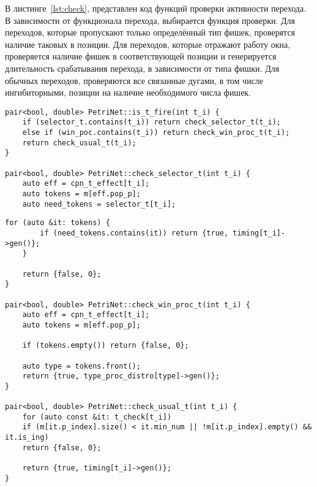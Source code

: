 В листинге~\ref{lst:check}, представлен код функций проверки активности перехода. В зависимости от функционала перехода, выбирается функция проверки. Для переходов, которые пропускают только определённый тип фишек, проверятся наличие таковых в позиции. Для переходов, которые отражают работу окна, проверяется наличие фишек в соответствующей позиции и генерируется длительность срабатывания перехода, в зависимости от типа фишки. Для обычных переходов, проверяются все связанные дугами, в том числе ингибиторными, позиции на наличие необходимого числа фишек.

\begin{center}
	\captionsetup{justification=raggedright,singlelinecheck=off}
	\begin{lstlisting}[label=lst:check,caption=Функции проверки автивности перехода ,showstringspaces=false]
pair<bool, double> PetriNet::is_t_fire(int t_i) {
	if (selector_t.contains(t_i)) return check_selector_t(t_i);
	else if (win_poc.contains(t_i)) return check_win_proc_t(t_i);
	return check_usual_t(t_i);
}

pair<bool, double> PetriNet::check_selector_t(int t_i) {
	auto eff = cpn_t_effect[t_i];
	auto tokens = m[eff.pop_p];
	auto need_tokens = selector_t[t_i];
	\end{lstlisting}
\end{center}
\FloatBarrier

\begin{center}
	\captionsetup{justification=raggedright,singlelinecheck=off}
	\begin{lstlisting}[label=lst:check2,title=Продолжение листинга \ref{lst:check},showstringspaces=false,firstnumber=11]
	for (auto &it: tokens) {
		if (need_tokens.contains(it)) return {true, timing[t_i]->gen()};
	}
	
	return {false, 0};
}

pair<bool, double> PetriNet::check_win_proc_t(int t_i) {
	auto eff = cpn_t_effect[t_i];
	auto tokens = m[eff.pop_p];
	
	if (tokens.empty()) return {false, 0};
	
	auto type = tokens.front();
	return {true, type_proc_distro[type]->gen()};
}

pair<bool, double> PetriNet::check_usual_t(int t_i) {
	for (auto const &it: t_check[t_i])
	if (m[it.p_index].size() < it.min_num || !m[it.p_index].empty() && it.is_ing)
	return {false, 0};
	
	return {true, timing[t_i]->gen()};
}
	\end{lstlisting}
\end{center}
\FloatBarrier

